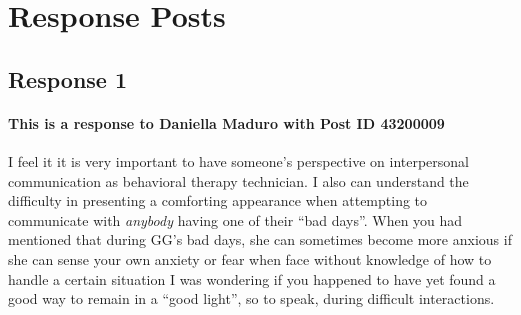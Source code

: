 
\section{Response Posts}
  \subsection{Response 1}
    \paragraph{This is a response to Daniella Maduro with Post ID 43200009}
    I feel it it is very important to have someone's perspective on
      interpersonal communication as behavioral therapy technician. I also can
      understand the difficulty in presenting a comforting appearance when
      attempting to communicate with \textit{anybody} having one of their
      ``bad days''. When you had mentioned that during GG's bad days, she can
      sometimes become more anxious if she can sense your own anxiety or fear
      when face without knowledge of how to handle a certain situation I was
      wondering if you happened to have yet found a good way to remain in a
      ``good light'', so to speak, during difficult interactions.
